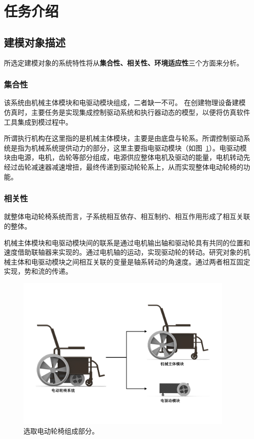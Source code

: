 \section{任务介绍}

\subsection{建模对象描述}

所选定建模对象的系统特性将从\textbf{集合性、相关性、环境适应性}三个方面来分析。

\subsubsection{集合性}

该系统由机械主体模块和电驱动模块组成，二者缺一不可。 在创建物理设备建模仿真时，主要任务是实现集成控制驱动系统和执行器动态的模型，以便将仿真软件工具集成到模过程中。 

所谓执行机构在这里指的是机械主体模块，主要是由底盘与轮系。所谓控制驱动系统是指为机械系统提供动力的部分，这里主要指电驱动模块（如图~\ref{fig:PW_parts}）。电驱动模块由电源，电机，齿轮等部分组成，电源供应整体电机及驱动的能量，电机转动先经过齿轮减速器减速增扭，最终传递到驱动轮轮系上，从而实现整体电动轮椅的功能。

\subsubsection{相关性}

就整体电动轮椅系统而言，子系统相互依存、相互制约、相互作用形成了相互关联的整体。

机械主体模块和电驱动模块间的联系是通过电机输出轴和驱动轮具有共同的位置和速度借助联轴器来实现的。通过电机轴的运动，实现驱动轮的转动。研究对象的机械主体和电驱动模块之间相互关联的变量是轴系转动的角速度。通过两者相互固定实现，势和流的传递。

\begin{figure}[!h]
	\centering
	\includegraphics[width=0.96\textwidth]{fig/PW_parts.pdf}
	\caption{选取电动轮椅组成部分。}\label{fig:PW_parts}
\end{figure}

